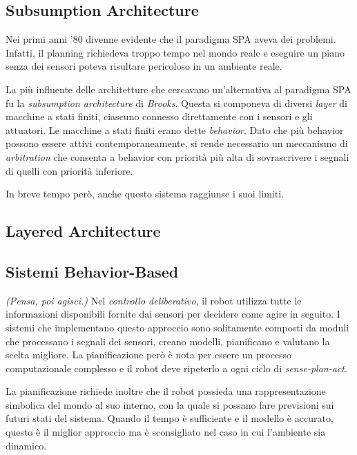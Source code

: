 \documentclass[a4paper,portrait,12pt]{article}
\theoremstyle{definition}
\begin{document}
\subsection{Subsumption Architecture}

Nei primi anni '80 divenne evidente che il paradigma SPA aveva dei problemi.
Infatti, il planning richiedeva troppo tempo nel mondo reale e eseguire un piano senza dei sensori poteva risultare pericoloso in un ambiente reale.

La più influente delle architetture che cercavano un'alternativa al paradigma SPA fu la \emph{subsumption architecture} di \emph{Brooks}.
Questa si componeva di diversi \emph{layer} di macchine a stati finiti, ciascuno connesso direttamente con i sensori e gli attuatori.
Le macchine a stati finiti erano dette \emph{behavior}.
Dato che più behavior possono essere attivi contemporaneamente, si rende necessario un meccanismo di \emph{arbitration} che consenta a behavior con priorità più alta di sovrascrivere i segnali di quelli con priorità inferiore.

In breve tempo però, anche questo sistema raggiunse i suoi limiti.

\subsection{Layered Architecture}

\subsection{Sistemi Behavior-Based}

\emph{(Pensa, poi agisci.)}
Nel \emph{controllo deliberativo}, il robot utilizza tutte le informazioni disponibili fornite dai sensori per decidere come agire in seguito.
I sistemi che implementano questo approccio sono solitamente composti da moduli che processano i segnali dei sensori, creano modelli, pianificano e valutano la scelta migliore.
La pianificazione però è nota per essere un processo computazionale complesso e il robot deve ripeterlo a ogni ciclo di \emph{sense-plan-act}.

La pianificazione richiede inoltre che il robot possieda una rappresentazione simbolica del mondo al suo interno, con la quale si possano fare previsioni sui futuri stati del sistema.
Quando il tempo è sufficiente e il modello è accurato, questo è il miglior approccio ma è sconsigliato nel caso in cui l'ambiente sia dinamico.\\
\end{document}
